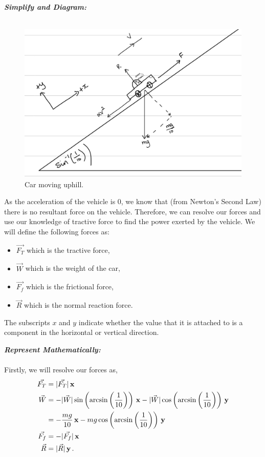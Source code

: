 \begin{subquestions}
	
	
\textbf{\textit{Simplify and Diagram:}} \\ \\	
\begin{figure}[H]
	\begin{center}
		\includegraphics[scale=0.25]{../2009/figures/2009q5-1}
		\caption{\label{2009:q5:Diagram1} Car moving uphill.}
	\end{center}
\end{figure}

As the acceleration of the vehicle is 0, we know that (from Newton's Second Law) there is no resultant force on the vehicle. Therefore, we can resolve our forces and use our knowledge of tractive force to find the power exerted by the vehicle. We will define the following forces as:
\begin{itemize}
	\item $\vec{F_T}$ which is the tractive force,
	\item $\vec{W}$ which is the weight of the car,
	\item $\vec{F_f}$ which is the frictional force,
	\item $\vec{R}$ which is the normal reaction force.
\end{itemize}
The subscripts $x$ and $y$ indicate whether the value that it is attached to is a component in the horizontal or vertical direction.


\textbf{\textit{Represent Mathematically:}} \\ \\
Firstly, we will resolve our forces as, 
\begin{align}
	\vec{F_T} & = |\vec{F_T}|\,\mathbf{x} \\
	\vec{W} & = -|\vec{W}|\sin\left(\arcsin\left(\frac{1}{10}\right)\right)\,\mathbf{x} -|\vec{W}|\cos\left(\arcsin\left(\frac{1}{10}\right)\right)\,\mathbf{y} \nonumber \\
	        & = -\frac{mg}{10}\,\mathbf{x} - mg\cos\left(\arcsin\left(\frac{1}{10}\right)\right)\,\mathbf{y} \\
	\vec{F_f} & = -|\vec{F_f}|\,\mathbf{x} \\
	\vec{R} & = |\vec{R}|\,\mathbf{y} \,.
\end{align}


\end{subquestions}
